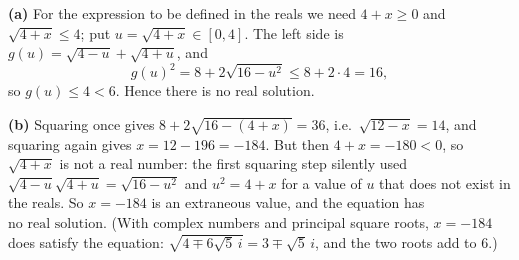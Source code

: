 \textbf{(a)} For the expression to be defined in the reals we need $4+x\ge0$ and $\sqrt{4+x}\le4$; put $u=\sqrt{4+x}\in[0,4]$. The left side is $g(u)=\sqrt{4-u}+\sqrt{4+u}$, and
\[
g(u)^2=8+2\sqrt{16-u^2}\le8+2\cdot4=16 ,
\]
so $g(u)\le4<6$. Hence there is no real solution.

\textbf{(b)} Squaring once gives $8+2\sqrt{16-(4+x)}=36$, i.e.\ $\sqrt{12-x}=14$, and squaring again gives $x=12-196=-184$. But then $4+x=-180<0$, so $\sqrt{4+x}$ is not a real number: the first squaring step silently used $\sqrt{4-u}\sqrt{4+u}=\sqrt{16-u^2}$ and $u^2=4+x$ for a value of $u$ that does not exist in the reals. So $x=-184$ is an extraneous value, and the equation has $\boxed{\text{no real solution}}$. (With complex numbers and principal square roots, $x=-184$ does satisfy the equation: $\sqrt{4\mp6\sqrt5\,i}=3\mp\sqrt5\,i$, and the two roots add to $6$.)

